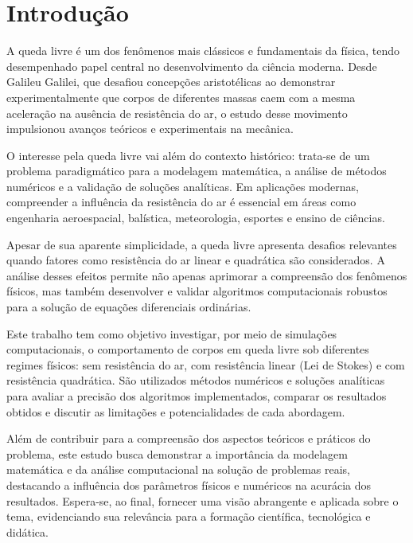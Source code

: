 
\chapter{Introdução}
\label{chap_introducao}



A queda livre é um dos fenômenos mais clássicos e fundamentais da física, tendo desempenhado papel central no desenvolvimento da ciência moderna. Desde Galileu Galilei, que desafiou concepções aristotélicas ao demonstrar experimentalmente que corpos de diferentes massas caem com a mesma aceleração na ausência de resistência do ar, o estudo desse movimento impulsionou avanços teóricos e experimentais na mecânica.

O interesse pela queda livre vai além do contexto histórico: trata-se de um problema paradigmático para a modelagem matemática, a análise de métodos numéricos e a validação de soluções analíticas. Em aplicações modernas, compreender a influência da resistência do ar é essencial em áreas como engenharia aeroespacial, balística, meteorologia, esportes e ensino de ciências.

Apesar de sua aparente simplicidade, a queda livre apresenta desafios relevantes quando fatores como resistência do ar linear e quadrática são considerados. A análise desses efeitos permite não apenas aprimorar a compreensão dos fenômenos físicos, mas também desenvolver e validar algoritmos computacionais robustos para a solução de equações diferenciais ordinárias.

Este trabalho tem como objetivo investigar, por meio de simulações computacionais, o comportamento de corpos em queda livre sob diferentes regimes físicos: sem resistência do ar, com resistência linear (Lei de Stokes) e com resistência quadrática. São utilizados métodos numéricos e soluções analíticas para avaliar a precisão dos algoritmos implementados, comparar os resultados obtidos e discutir as limitações e potencialidades de cada abordagem.

Além de contribuir para a compreensão dos aspectos teóricos e práticos do problema, este estudo busca demonstrar a importância da modelagem matemática e da análise computacional na solução de problemas reais, destacando a influência dos parâmetros físicos e numéricos na acurácia dos resultados. Espera-se, ao final, fornecer uma visão abrangente e aplicada sobre o tema, evidenciando sua relevância para a formação científica, tecnológica e didática.

